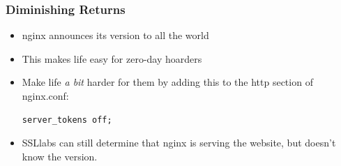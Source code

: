 \documentclass[9pt]{beamer}
\begin{document}
\begin{frame}[fragile]
\frametitle{Diminishing Returns}
\begin{itemize}
\item nginx announces its version to all the world
\pause
\item This makes life easy for zero-day hoarders
\pause
\item Make life \emph{a bit} harder for them by adding this to the http section of nginx.conf:
\begin{verbatim}
server_tokens off;
\end{verbatim}
\pause
\item SSLlabs can still determine that nginx is serving the website, but doesn't know the version.
\end{itemize}
\end{frame}
\end{document}
